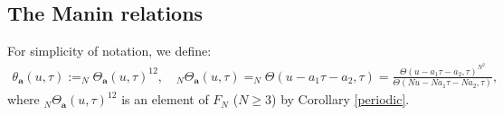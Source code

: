 \documentclass[12pt,amstex,amssymb]{article}
\theoremstyle{plain}
\theoremstyle{definition}
\def\cE{{\cal E}}
\def\cR{{\cal R}}
\def\cF{{\cal F}}
\def\cM{{\cal M}}
\def\Z{{\mathbb Z}}
\def\A{{\mathbb A}}
\def\C{{\mathbb C}}
\def\Q{{\mathbb Q}}
\newcommand{\be}{\begin{eqnarray*}}
\newcommand{\ee}{\end{eqnarray*}}
\newcommand{\GL}{\operatorname{GL}}
\newcommand{\ba}{\mathbf{a}}
\newcommand{\tfH}{\tilde{\mathfrak{H}}}
\begin{document}









\subsection{The Manin relations}\label{ManinRelsProof}
For simplicity of notation, we define:
\be
\theta_{\ba}(u, \tau):=_{N}\!\Theta_{\ba}(u,\tau)^{12},\quad
_{N}\!\Theta_{\ba}(u,\tau)=_{N}\!\Theta (u-a_1\tau-a_2, \tau)=\frac{\Theta(u-a_1\tau-a_2,\tau)^{N^2}}{\Theta(Nu-Na_1\tau-Na_2,\tau)},
\ee
where $_{N}\!\Theta_{\ba}(u,\tau)^{12}$ is an element of $F_N$ ($N\geq 3$) by Corollary \ref{periodic}.  
%
%
\end{document}

